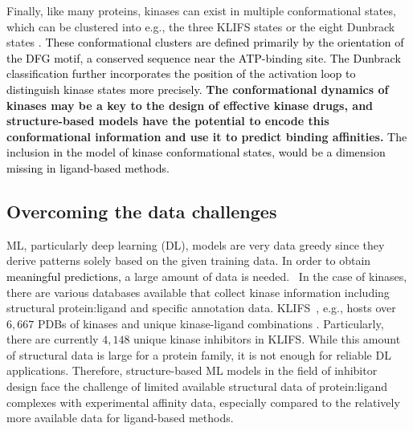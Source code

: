 \documentclass[9pt,lessons, pubversion]{livecoms}
\newcommand{\revision}[1]{\textcolor{black}{#1}}
\begin{document}
Finally, like many proteins, kinases can exist in multiple conformational states, which can be clustered into e.g., the three KLIFS states \cite{Kanev2020} or the eight Dunbrack states \cite{modi2019defining, modi2022kincore}. \revision{These conformational clusters are defined primarily by the orientation of the DFG motif, a conserved sequence near the ATP-binding site. The Dunbrack classification further incorporates the position of the activation loop to distinguish kinase states more precisely.} \textbf{The conformational dynamics of kinases may be a key to the design of effective kinase drugs, and structure-based models have the potential to encode this conformational information and use it to predict binding affinities.} \revision{The inclusion in the model of kinase conformational states, would be a dimension missing in ligand-based methods.}%


\subsection{Overcoming the data challenges}
ML, particularly deep learning (DL), models are very data greedy since they derive patterns solely based on the given training data. In order to obtain \revision{meaningful predictions,} a large amount of data is needed.~\cite{kimber2021deep} In the case of kinases, there are various databases available that collect kinase information including structural protein:ligand and specific annotation data. KLIFS~\cite{kooistra2016klifs}, e.g., hosts over $6,667$ PDBs of kinases and unique kinase-ligand combinations \cite{Kanev2020}. Particularly, there are currently $4,148$ unique kinase inhibitors in KLIFS. While this amount of structural data is large for a protein family, it is not enough for reliable DL applications. Therefore, structure-based ML models in the field of inhibitor design face the challenge of limited available structural data of protein:ligand complexes with experimental affinity data, especially compared to the relatively more available data for ligand-based methods.
\end{document}
